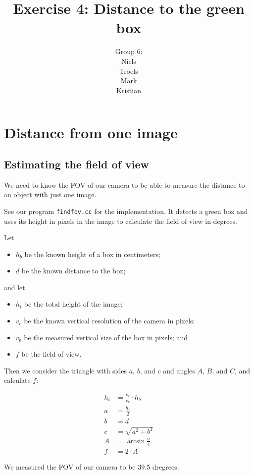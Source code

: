\documentclass[a4paper,12pt]{article}
\title{Exercise 4: Distance to the green box}
\author{Group 6:\\Niels\\Troels\\Mark\\Kristian}
\begin{document}
\maketitle

\section{Distance from one image}

\subsection{Estimating the field of view}

We need to know the FOV of our camera to be able to measure the distance to an
object with just one image.

See our program \texttt{findfov.cc} for the implementation.  It detects a green
box and uses its height in pixels in the image to calculate the field of view in
degrees.

Let
\begin{itemize}
\item $h_b$ be the known height of a box in centimeters;
\item $d$ be the known distance to the box;
\end{itemize}

and let
\begin{itemize}
\item $h_t$ be the total height of the image;
\item $v_c$ be the known vertical resolution of the camera in pixels;
\item $v_b$ be the measured vertical size of the box in pixels; and
\item $f$ be the field of view.
\end{itemize}

Then we consider the triangle with sides $a$, $b$, and $c$ and angles $A$, $B$,
and $C$, and calculate $f$:

\begin{align*}
  h_t &= \frac{v_c}{v_b} \cdot h_b\\
  a &= \frac{h_t}{2}\\
  b &= d\\
  c &= \sqrt{a^2 + b^2}\\
  A &= \arcsin \frac{a}{c}\\
  f &= 2 \cdot A
\end{align*}

We measured the FOV of our camera to be 39.5 dregrees.
\end{document}
